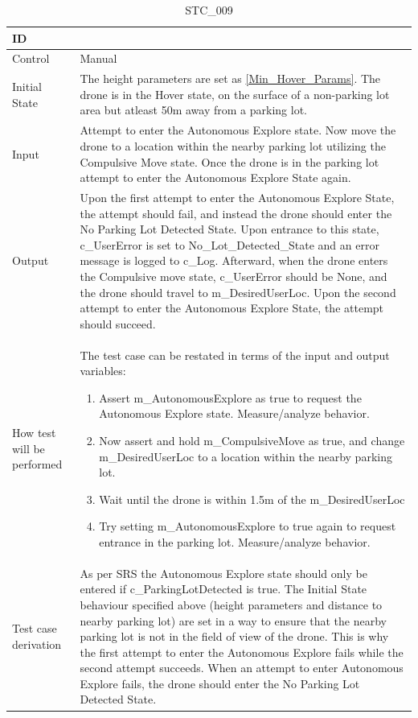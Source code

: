 \documentclass[12pt, titlepage]{article}
\begin{document}
\begin{table}[!h]
\begin{center}
\caption {STC\_009}
\label{tab:STC_009}
\begin{tabular}{ | m{1.5cm} | m{15cm} | } 
\hline
ID & \nameref{tab:STC_009} \\ 
\hline
Control & Manual \\ 
\hline
Initial State & The height parameters are set as \ref{Min_Hover_Params}. The drone is in the Hover state, on the surface of a non-parking lot area but atleast 50m away from a parking lot.  \\ 
\hline
Input & Attempt to enter the Autonomous Explore state. Now move the drone to a location within the nearby parking lot utilizing the Compulsive Move state. Once the drone is in the parking lot attempt to enter the Autonomous Explore State again. \\ 
\hline
Output & Upon the first attempt to enter the Autonomous Explore State, the attempt should fail, and instead the drone should enter the No Parking Lot Detected State. Upon entrance to this state, c_UserError is set to No_Lot_Detected_State and an error message is logged to c_Log. Afterward, when the drone enters the Compulsive move state, c_UserError should be None, and the drone should travel to m_DesiredUserLoc. Upon the second attempt to enter the Autonomous Explore State, the attempt should succeed. \\ 
\hline
How test will be performed & 
The test case can be restated in terms of the input and output variables: 
\begin{enumerate}[topsep=0pt,itemsep=-1ex,partopsep=1ex,parsep=1ex]
	\item Assert m_AutonomousExplore as true to request the Autonomous Explore state. Measure/analyze behavior. 
	\item Now assert and hold m_CompulsiveMove as true, and change m_DesiredUserLoc to a location within the nearby parking lot. 
	\item Wait until the drone is within 1.5m of the m_DesiredUserLoc
	\item Try setting m_AutonomousExplore to true again to request entrance in the parking lot. Measure/analyze behavior.  \end{enumerate} \\
\hline
Test case derivation & As per SRS the Autonomous Explore state should only be entered if c_ParkingLotDetected is true. The Initial State behaviour specified above (height parameters and distance to nearby parking lot) are set in a way to ensure that the nearby parking lot is not in the field of view of the drone. This is why the first attempt to enter the Autonomous Explore fails while the second attempt succeeds. When an attempt to enter Autonomous Explore fails, the drone should enter the No Parking Lot Detected State.


\end{tabular}
\end{center}
\end{table}
\end{document}
